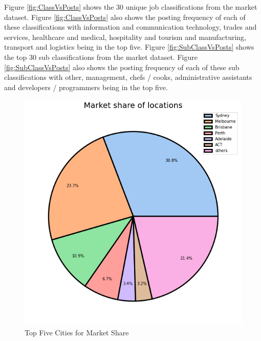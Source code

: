 \documentclass[twoside, 12pt, a4paper]{article}
\begin{document}
\newpage 
Figure \ref{fig:ClassVsPosts} shows the 30 unique job classifications from the market dataset. Figure \ref{fig:ClassVsPosts} also shows the posting frequency of each of these classifications with information and communication technology, trades and services, healthcare and medical, hospitality and tourism and manufacturing, transport and logistics being in the top five. Figure \ref{fig:SubClassVsPosts} shows the top 30 sub classifications from the market dataset. Figure \ref{fig:SubClassVsPosts} also shows the posting frequency of each of these sub classifications with other, management, chefs / cooks, administrative assistants and developers / programmers being in the top five. 

\begin{figure}[h!]
	\centering
	\includegraphics[scale = 0.60]{TopCities.png}
	\caption{Top Five Cities for Market Share}
	\label{fig:TopFiveCities}
\end{figure}
\end{document}

